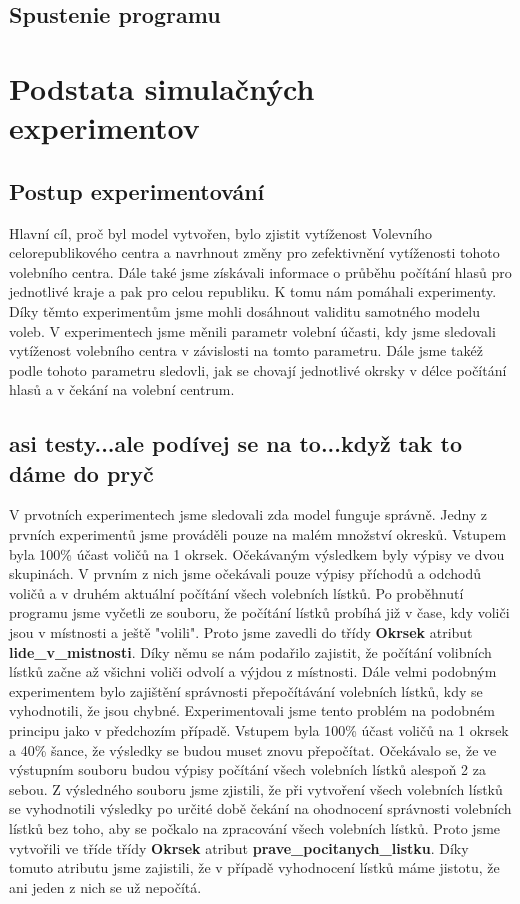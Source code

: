 \documentclass[12pt,a4paper,titlepage,final]{article}
\begin{document}
\subsection{Spustenie programu}
\newpage


\section{Podstata simulačných experimentov}
\subsection{Postup experimentování}
Hlavní cíl, proč byl model vytvořen, bylo zjistit vytíženost Volevního celorepublikového centra a navrhnout změny pro zefektivnění vytíženosti tohoto volebního centra. Dále také jsme získávali informace o průběhu počítání hlasů pro jednotlivé kraje a pak pro celou republiku. K tomu nám pomáhali experimenty. Díky těmto experimentům jsme mohli dosáhnout validitu samotného modelu voleb. V experimentech jsme měnili parametr volební účasti, kdy jsme sledovali vytíženost volebního centra v závislosti na tomto parametru. Dále jsme takéž podle tohoto parametru sledovli, jak se chovají jednotlivé okrsky v délce počítání hlasů a v čekání na volební centrum. 
\subsection{asi testy...ale podívej se na to...když tak to dáme do pryč}
V prvotních experimentech jsme sledovali zda model funguje správně. Jedny z prvních experimentů jsme prováděli pouze na malém množství okresků. Vstupem byla 100\% účast voličů na 1 okrsek. Očekávaným výsledkem byly výpisy ve dvou skupinách. V prvním z nich jsme očekávali pouze výpisy příchodů a odchodů voličů a v druhém aktuální počítání všech volebních lístků. Po proběhnutí programu jsme vyčetli ze souboru, že počítání lístků probíhá již v čase, kdy voliči jsou v místnosti a ještě "volili". Proto jsme zavedli do třídy \textbf{Okrsek} atribut \textbf{lide\_v\_mistnosti}. Díky němu se nám podařilo zajistit, že počítání volibních lístků začne až všichni voliči odvolí a výjdou z místnosti. 
Dále velmi podobným experimentem bylo zajištění správnosti přepočítávání volebních lístků, kdy se vyhodnotili, že jsou chybné. Experimentovali jsme tento problém na podobném principu jako v předchozím případě. Vstupem byla 100\% účast voličů na 1 okrsek a 40\% šance, že výsledky se budou muset znovu přepočítat. Očekávalo se, že ve výstupním souboru budou výpisy počítání všech volebních lístků alespoň 2 za sebou. Z výsledného souboru jsme zjistili, že při vytvoření všech volebních lístků se vyhodnotili výsledky po určité době čekání na ohodnocení správnosti volebních lístků bez toho, aby se počkalo na zpracování všech volebních lístků. Proto jsme vytvořili ve tříde třídy \textbf{Okrsek} atribut \textbf{prave\_pocitanych\_listku}. Díky tomuto atributu jsme zajistili, že v případě vyhodnocení lístků máme jistotu, že ani jeden z nich se už nepočítá. 
\end{document}
